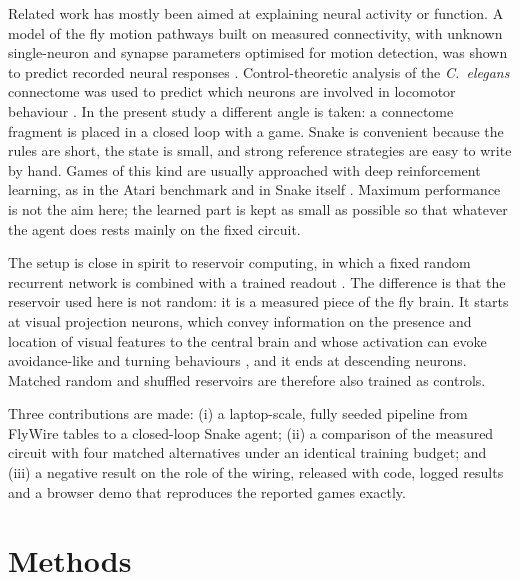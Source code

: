 \documentclass[11pt]{article}
\begin{document}
Related work has mostly been aimed at explaining neural activity or function. A model of the fly
motion pathways built on measured connectivity, with unknown single-neuron and synapse parameters
optimised for motion detection, was shown to predict recorded neural responses
\cite{lappalainen2024}. Control-theoretic analysis of the \textit{C.\ elegans} connectome was used to
predict which neurons are involved in locomotor behaviour \cite{yan2017}. In the present study a
different angle is taken: a connectome fragment is placed in a closed loop with a game. Snake is
convenient because the rules are short, the state is small, and strong reference strategies are easy
to write by hand. Games of this kind are usually approached with deep reinforcement learning, as in
the Atari benchmark \cite{mnih2015} and in Snake itself \cite{wei2018}. Maximum performance is not
the aim here; the learned part is kept as small as possible so that whatever the agent does rests
mainly on the fixed circuit.

The setup is close in spirit to reservoir computing, in which a fixed random recurrent network is
combined with a trained readout \cite{jaeger2004}. The difference is that the reservoir used here is
not random: it is a measured piece of the fly brain. It starts at visual projection neurons, which
convey information on the presence and location of visual features to the central brain and whose
activation can evoke avoidance-like and turning behaviours \cite{wu2016}, and it ends at descending
neurons. Matched random and shuffled reservoirs are therefore also trained as controls.

Three contributions are made: (i) a laptop-scale, fully seeded pipeline from FlyWire tables to a
closed-loop Snake agent; (ii) a comparison of the measured circuit with four matched alternatives
under an identical training budget; and (iii) a negative result on the role of the wiring, released
with code, logged results and a browser demo that reproduces the reported games exactly.

\section{Methods}
\end{document}
